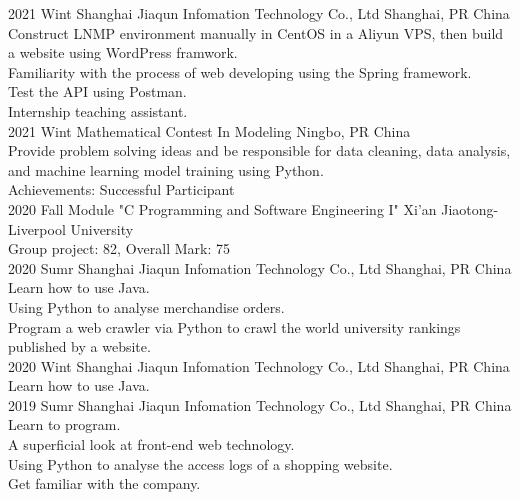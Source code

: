 \documentclass[]{cv-style}          %
\begin{document}
\begin{entrylist}
\entry
  {2021 Wint}
  {Shanghai Jiaqun Infomation Technology Co., Ltd}
  {Shanghai, PR China}
  {\\
  Construct LNMP environment manually in CentOS in a Aliyun VPS, then build a website using WordPress framwork.\\
  Familiarity with the process of web developing using the Spring framework.\\
  Test the API using Postman.\\
  Internship teaching assistant.\\}
\entry
  {2021 Wint}
  {Mathematical Contest In Modeling}
  {Ningbo, PR China}
  {\\
  Provide problem solving ideas and be responsible for data cleaning, data analysis, and machine learning model training using Python.\\
  Achievements: Successful Participant\\}
\entry
  {2020 Fall}
  {Module "C Programming and Software Engineering I"}
  {Xi'an Jiaotong-Liverpool University}
  {\\
  Group project: 82, Overall Mark: 75\\}
\entry
  {2020 Sumr}
  {Shanghai Jiaqun Infomation Technology Co., Ltd}
  {Shanghai, PR China}
  {\\
  Learn how to use Java.\\
  Using Python to analyse merchandise orders.\\
  Program a web crawler via Python to crawl the world university rankings published by a website.\\}
\entry
  {2020 Wint}
  {Shanghai Jiaqun Infomation Technology Co., Ltd}
  {Shanghai, PR China}
  {\\
  Learn how to use Java.\\}
\entry
  {2019 Sumr}
  {Shanghai Jiaqun Infomation Technology Co., Ltd}
  {Shanghai, PR China}
  {\\
  Learn to program.\\
  A superficial look at front-end web technology.\\
  Using Python to analyse the access logs of a shopping website.\\
  Get familiar with the company.\\}

\end{entrylist}
\end{document}
